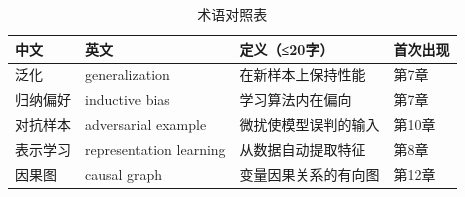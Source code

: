
\begin{table}[htbp]
\centering
\caption{术语对照表}
\begin{tabular}{@{}p{3.2cm}p{3.2cm}p{7.5cm}p{2.2cm}@{}}
\toprule
中文 & 英文 & 定义（≤20字） & 首次出现 \\
\midrule
泛化 & generalization & 在新样本上保持性能 & 第7章 \\
归纳偏好 & inductive bias & 学习算法内在偏向 & 第7章 \\
对抗样本 & adversarial example & 微扰使模型误判的输入 & 第10章 \\
表示学习 & representation learning & 从数据自动提取特征 & 第8章 \\
因果图 & causal graph & 变量因果关系的有向图 & 第12章 \\
\bottomrule
\end{tabular}
\end{table}